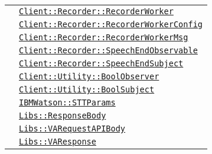 \begin{longtable}{|>{\centering}m{3cm}|m{10cm}<{\centering}|}
& \hyperref[Client::Recorder::RecorderWorker]{\texttt{Client::Recorder::RecorderWorker}}\\
& \hyperref[Client::Recorder::RecorderWorkerConfig]{\texttt{Client::Recorder::RecorderWorkerConfig}}\\
& \hyperref[Client::Recorder::RecorderWorkerMsg]{\texttt{Client::Recorder::RecorderWorkerMsg}}\\
& \hyperref[Client::Recorder::SpeechEndObservable]{\texttt{Client::Recorder::SpeechEndObservable}}\\
& \hyperref[Client::Recorder::SpeechEndSubject]{\texttt{Client::Recorder::SpeechEndSubject}}\\
& \hyperref[Client::Utility::BoolObserver]{\texttt{Client::Utility::BoolObserver}}\\
& \hyperref[Client::Utility::BoolSubject]{\texttt{Client::Utility::BoolSubject}}\\
& \hyperref[IBMWatson::STTParams]{\texttt{IBMWatson::STTParams}}\\
& \hyperref[Libs::ResponseBody]{\texttt{Libs::ResponseBody}}\\
& \hyperref[Libs::VARequestAPIBody]{\texttt{Libs::VARequestAPIBody}}\\
& \hyperref[Libs::VAResponse]{\texttt{Libs::VAResponse}}\\ \hline


\end{longtable}
